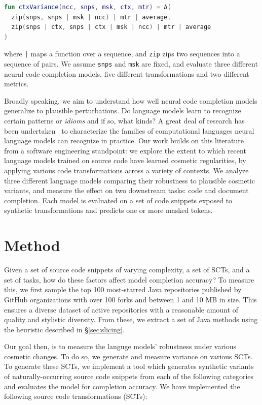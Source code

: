 \documentclass[sigconf,review,anonymous]{acmart}
\begin{document}
  \noindent\begin{lstlisting}[basicstyle=\footnotesize\ttfamily, language=kotlin,label={lst:lstlisting}]
fun ctxVariance(ncc, snps, msk, ctx, mtr) = Δ(
  zip(snps, snps | msk | ncc) | mtr | average,
  zip(snps | ctx, snps | ctx | msk | ncc) | mtr | average
)
  \end{lstlisting}

  \noindent where \texttt{|} maps a function over a sequence, and \lstinline|zip| zips two sequences into a sequence of pairs. We assume \lstinline|snps| and \lstinline|msk| are fixed, and evaluate three different neural code completion models, five different transformations and two different metrics.

  Broadly speaking, we aim to understand how well neural code completion models generalize to plausible perturbations. Do language models learn to recognize certain patterns or \textit{idioms} and if so, what kinds? A great deal of research has been undertaken~\citep{weiss2018practical, chirkova2020empirical, chen2021evaluating} to characterize the families of computational languages neural language models can recognize in practice. Our work builds on this literature from a software engineering standpoint: we explore the extent to which recent language models trained on source code have learned cosmetic regularities, by applying various code transformations across a variety of contexts. We analyze three different language models comparing their robustness to plausible cosmetic variants, and measure the effect on two downstream tasks: code and document completion. Each model is evaluated on a set of code snippets exposed to synthetic transformations and predicts one or more masked tokens.


  \section{Method}

  Given a set of source code snippets of varying complexity, a set of SCTs, and a set of tasks, how do these factors affect model completion accuracy? To measure this, we first sample the top 100 most-starred Java repositories published by GitHub organizations with over 100 forks and between 1 and 10 MB in size. This ensures a diverse dataset of active repositories with a reasonable amount of quality and stylistic diversity. From these, we extract a set of Java methods using the heuristic described in \S\ref{sec:slicing}.

  Our goal then, is to measure the languge models' robustness under various cosmetic changes. To do so, we generate and measure variance on various SCTs. To generate these SCTs, we implement a tool which generates synthetic variants of naturally-occurring source code snippets from each of the following categories and evaluates the model for completion accuracy. We have implemented the following source code transformations (SCTs):
\end{document}
